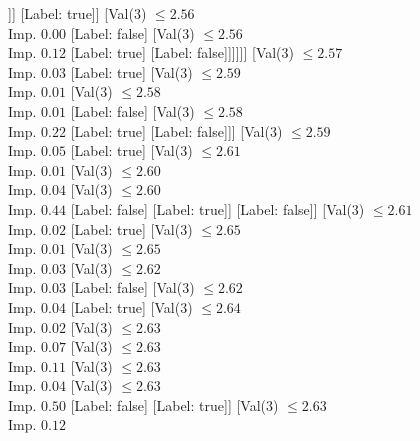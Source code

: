 \documentclass[margin=10pt]{standalone}
\begin{document}
\begin{forest}
														[Label: false]
														[Val($3$) $ \leq 2.54$ \\ Imp. $0.32$
															[Label: true]
															[Label: false]]]
													[Label: true]]
												[Val($3$) $ \leq 2.56$ \\ Imp. $0.00$
													[Label: false]
													[Val($3$) $ \leq 2.56$ \\ Imp. $0.12$
														[Label: true]
														[Label: false]]]]]]
									[Val($3$) $ \leq 2.57$ \\ Imp. $0.03$
										[Label: true]
										[Val($3$) $ \leq 2.59$ \\ Imp. $0.01$
											[Val($3$) $ \leq 2.58$ \\ Imp. $0.01$
												[Label: false]
												[Val($3$) $ \leq 2.58$ \\ Imp. $0.22$
													[Label: true]
													[Label: false]]]
											[Val($3$) $ \leq 2.59$ \\ Imp. $0.05$
												[Label: true]
												[Val($3$) $ \leq 2.61$ \\ Imp. $0.01$
													[Val($3$) $ \leq 2.60$ \\ Imp. $0.04$
														[Val($3$) $ \leq 2.60$ \\ Imp. $0.44$
															[Label: false]
															[Label: true]]
														[Label: false]]
													[Val($3$) $ \leq 2.61$ \\ Imp. $0.02$
														[Label: true]
														[Val($3$) $ \leq 2.65$ \\ Imp. $0.01$
															[Val($3$) $ \leq 2.65$ \\ Imp. $0.03$
																[Val($3$) $ \leq 2.62$ \\ Imp. $0.03$
																	[Label: false]
																	[Val($3$) $ \leq 2.62$ \\ Imp. $0.04$
																		[Label: true]
																		[Val($3$) $ \leq 2.64$ \\ Imp. $0.02$
																			[Val($3$) $ \leq 2.63$ \\ Imp. $0.07$
																				[Val($3$) $ \leq 2.63$ \\ Imp. $0.11$
																					[Val($3$) $ \leq 2.63$ \\ Imp. $0.04$
																						[Val($3$) $ \leq 2.63$ \\ Imp. $0.50$
																							[Label: false]
																							[Label: true]]
																						[Val($3$) $ \leq 2.63$ \\ Imp. $0.12$

\end{forest}
\end{document}
